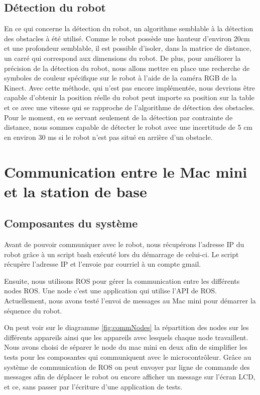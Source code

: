 \subsection{Détection du robot}
En ce qui concerne la détection du robot, un algorithme semblable à la détection des obstacles à été utilisé. Comme le robot possède une hauteur d'environ 20cm et une profondeur semblable, il est possible d'isoler, dans la matrice de distance, un carré qui correspond aux dimensions du robot. De plus, pour améliorer la précision de la détection du robot, nous allons mettre en place une recherche de symboles de couleur spécifique sur le robot à l'aide de la caméra RGB de la Kinect. Avec cette méthode, qui n'est pas encore implémentée, nous devrions être capable d'obtenir la position réelle du robot peut importe sa position sur la table et ce avec une vitesse qui se rapproche de l'algorithme de détection des obstacles. Pour le moment, en se servant seulement de la détection par contrainte de distance, nous sommes capable de détecter le robot avec une incertitude de 5 cm en environ 30 ms si le robot n'est pas situé en arrière d'un obstacle.

\section{Communication entre le Mac mini et la station de base}
\subsection{Composantes du système}
Avant de pouvoir communiquer avec le robot, nous récupérons l’adresse IP du robot grâce à un script bash exécuté lors du démarrage de celui-ci. Le script récupère l’adresse IP et l’envoie par courriel à un compte gmail.

Ensuite, nous utilisons ROS pour gérer la communication entre les différents nodes ROS. Une node c’est une application qui utilise l’API de ROS. Actuellement, nous avons testé l’envoi de messages au Mac mini pour démarrer la séquence du robot.

On peut voir sur le diagramme \ref{fig:commNodes} la répartition des nodes sur les différents appareils ainsi que les appareils avec lesquels chaque node travaillent. Nous avons choisi de séparer le node du mac mini en deux afin de simplifier les tests pour les composantes qui communiquent avec le microcontrôleur. Grâce au système de communication de ROS on peut envoyer par ligne de commande des messages afin de déplacer le robot ou encore afficher un message sur l’écran LCD, et ce, sans passer par l’écriture d’une application de tests.

